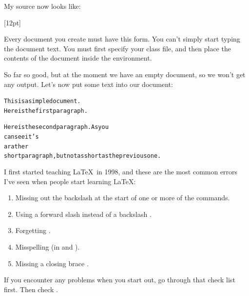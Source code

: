 My \gls{source} now looks like:
\begin{code}
[12pt]\newline
\mbox{}\newline
{}\newline
\mbox{}\newline
{}
\end{code}
Every document you create must have this form.  You can't simply
start typing the document text.  You must first specify
your class file\indexCLS, and then place the contents of the document
inside the  environment.\screenpagebreak

So far so good, but at the moment we have an empty document, so we
won't get any output.  Let's now put some text into our document:
\begin{code}
\begin{alltt}
\oarg{12pt}


This is a simple document.
Here is the first paragraph.

Here is the second paragraph. As you
can       see it's 
a rather 
short paragraph, but not as short as the previous one.

\end{alltt}
\end{code}

I first started teaching \LaTeX\ in 1998, and these are the most
common errors I've seen when people start learning \LaTeX:
\begin{enumerate}
\item Missing out the backslash  at the start
of one or more of the \glspl{command}.

\item Using a forward slash  instead of a backslash
.

\item Forgetting \texttt{}.

\item Misspelling  (in
\texttt{} and
\texttt{}).

\item Missing a closing brace .

\end{enumerate}
If you encounter any problems when you start out, go through that check list first.
Then check .

